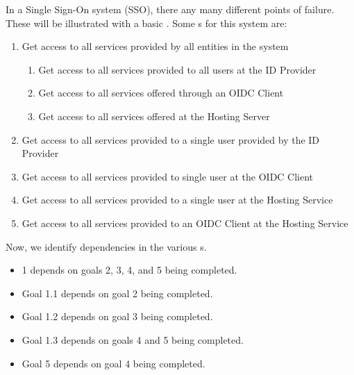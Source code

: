 In a Single Sign-On system (SSO), there any many different points of failure.
These will be illustrated with a basic .
Some s for this system are:
\begin{enumerate}[noitemsep]
\item Get access to all services provided by all entities in the system
  \begin{enumerate}[noitemsep]
  \item Get access to all services provided to all users at the ID Provider
  \item Get access to all services offered through an OIDC Client
  \item Get access to all services offered at the Hosting Server
  \end{enumerate}

\item Get access to all services provided to a single user provided by the ID Provider
\item Get access to all services provided to single user at the OIDC Client
\item Get access to all services provided to a single user at the Hosting Service
\item Get access to all services provided to an OIDC Client at the Hosting Service
\end{enumerate}

Now, we identify dependencies in the various s.
\begin{itemize}[noitemsep]
\item {} 1 depends on goals 2, 3, 4, and 5 being completed.
\item Goal 1.1 depends on goal 2 being completed.
\item Goal 1.2 depends on goal 3 being completed.
\item Goal 1.3 depends on goals 4 and 5 being completed.
\item Goal 5 depends on goal 4 being completed.
\end{itemize}


